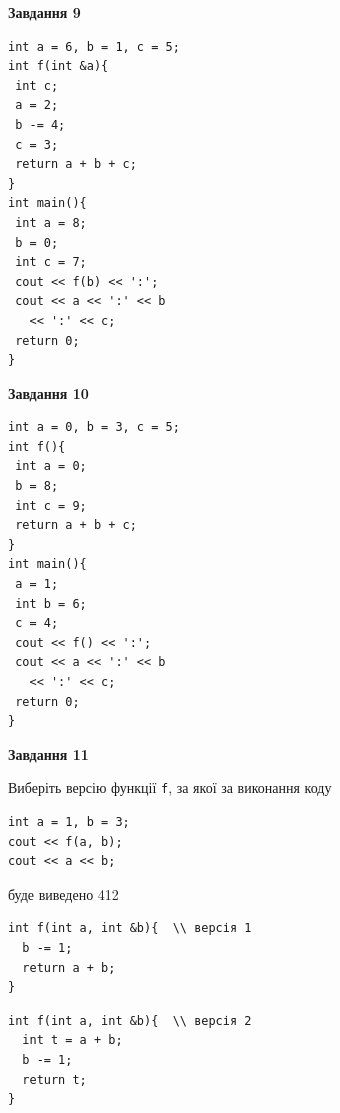 \documentclass[12pt, ukrainian]{article}
\def\code#1{\Verb!#1!}
\begin{document}
{\begin {large}
\begin{minipage}[t]{11.0cm}
\end{minipage}


\begin{minipage}[t]{7.0cm}

\begin{center}
\textbf{Завдання 9}
\end{center}
\vspace{-8mm}

\begin{verbatim}
int a = 6, b = 1, c = 5;
int f(int &a){
 int c;
 a = 2;
 b -= 4;
 c = 3;
 return a + b + c;
}
int main(){
 int a = 8;
 b = 0;
 int c = 7;
 cout << f(b) << ':';
 cout << a << ':' << b 
   << ':' << c;
 return 0;
}
\end{verbatim}



\begin{center}
\textbf{Завдання 10}
\end{center}
\vspace{-8mm}

\begin{verbatim}
int a = 0, b = 3, c = 5;
int f(){
 int a = 0;
 b = 8;
 int c = 9;
 return a + b + c;
}
int main(){
 a = 1;
 int b = 6;
 c = 4;
 cout << f() << ':';
 cout << a << ':' << b 
   << ':' << c;
 return 0;
}
\end{verbatim}

\end{minipage}
\vline \hspace{1mm}
\begin{minipage}[t]{11.0cm}

\begin{center}
\textbf{Завдання 11}
\end{center}
Виберіть версію функції \code{f}, за якої за виконання коду
\begin{verbatim}
int a = 1, b = 3;
cout << f(a, b);
cout << a << b;
\end{verbatim}

буде виведено 412

\begin{verbatim}
int f(int a, int &b){  \\ версія 1
  b -= 1;
  return a + b;
}
\end{verbatim}

\vspace{-8mm}\begin{verbatim}
int f(int a, int &b){  \\ версія 2
  int t = a + b;
  b -= 1;
  return t;
}
\end{verbatim}


\end{minipage}
\end{large}}
\end{document}
